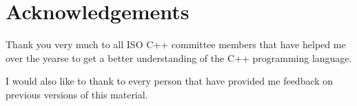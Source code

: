 \chapter*{Acknowledgements}

Thank you very much to all ISO C++ committee members that have helped
me over the yearse to get a better understanding of the C++ programming
language.

I would also like to thank to every person that have provided me feedback
on previous versions of this material.
